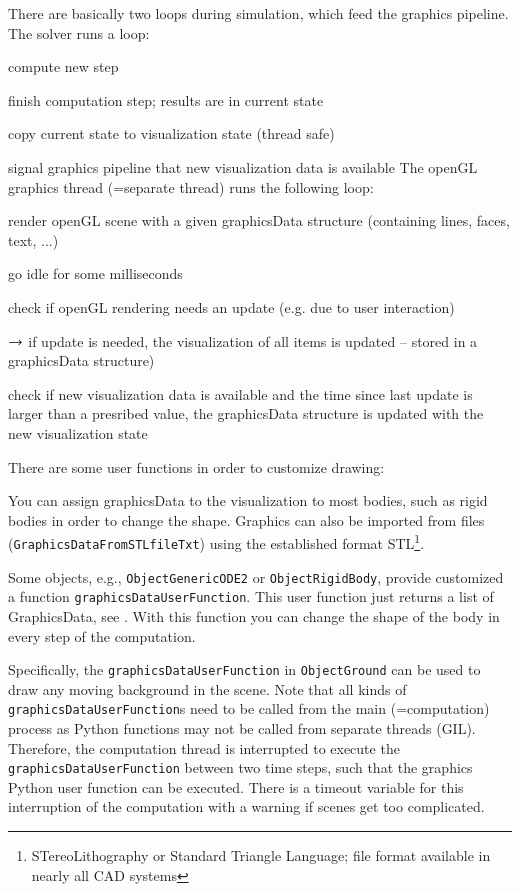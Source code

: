 There are basically two loops during simulation, which feed the graphics pipeline.
The solver runs a loop:
\bi
  \item compute new step
  \item finish computation step; results are in current state
  \item copy current state to visualization state (thread safe)
  \item signal graphics pipeline that new visualization data is available
\ei
The openGL graphics thread (=separate thread) runs the following loop:
\bi
  \item render openGL scene with a given graphicsData structure (containing lines, faces, text, ...)
  \item go idle for some milliseconds
  \item check if openGL rendering needs an update (e.g. due to user interaction)
  \item[] $\rightarrow$ if update is needed, the visualization of all items is updated -- stored in a graphicsData structure)
  \item check if new visualization data is available and the time since last update is larger than a presribed value, the graphicsData structure is updated with the new visualization state
\ei

There are some user functions in order to customize drawing:
\bi
  \item You can assign graphicsData to the visualization to most bodies, such as rigid bodies in order to change the shape. Graphics can also be imported from files (\texttt{GraphicsDataFromSTLfileTxt}) using the established format \ac{STL}\footnote{STereoLithography or Standard Triangle Language; file format available in nearly all CAD systems}.
  \item Some objects, e.g., \texttt{ObjectGenericODE2} or \texttt{ObjectRigidBody}, provide customized a function \texttt{graphicsDataUserFunction}. This user function just returns a list of GraphicsData, see . With this function you can change the shape of the body in every step of the computation.
  \item Specifically, the \texttt{graphicsDataUserFunction} in \texttt{ObjectGround} can be used to draw any moving background in the scene.
\ei
Note that all kinds of \texttt{graphicsDataUserFunction}s need to be called from the main (=computation) process as Python functions may not be called from separate threads (GIL). Therefore, the computation thread is interrupted to execute the \texttt{graphicsDataUserFunction} between two time steps, such that the graphics Python user function can be executed. There is a timeout variable for this interruption of the computation with a warning if scenes get too complicated.

